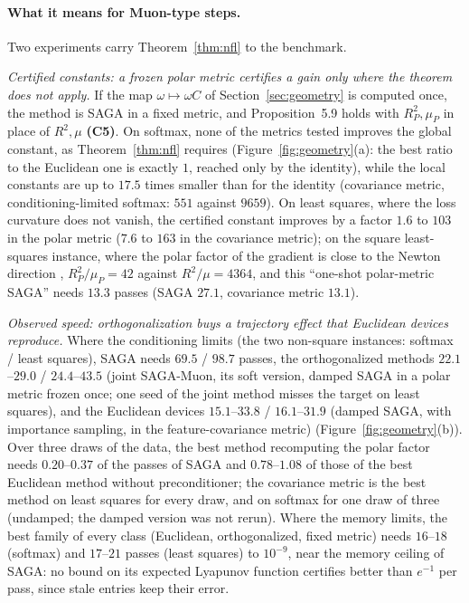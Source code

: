 \documentclass[10pt]{article}
\theoremstyle{remark}
\newcommand{\finding}[1]{\textbf{(#1)}}
\begin{document}
\paragraph{What it means for Muon-type steps.} Two experiments carry Theorem~\ref{thm:nfl} to the benchmark.

\begin{description}[leftmargin=2.3em,labelwidth=2.0em,labelsep=0.3em,itemsep=1pt,topsep=3pt,parsep=0pt,font=\normalfont\bfseries]
\item[(M4)] \emph{Certified constants: a frozen polar metric certifies a gain only where the theorem does not apply.} If
the map $\omega\mapsto\omega C$ of Section~\ref{sec:geometry} is computed once, the method is SAGA in a fixed metric,
and Proposition~5.9 holds with $R_P^2,\mu_P$ in place of $R^2,\mu$ \finding{C5}. On softmax, none of the metrics tested improves the
global constant, as Theorem~\ref{thm:nfl} requires (Figure~\ref{fig:geometry}(a): the best ratio to the Euclidean one is
exactly $1$, reached only by the identity), while the local constants are up to $17.5$ times smaller than for the
identity (covariance metric, conditioning-limited softmax: $551$ against $9659$). On least squares, where the
loss curvature does not vanish, the certified constant improves by a factor $1.6$ to $103$ in the polar metric ($7.6$ to $163$ in the covariance metric); on the square least-squares
instance, where the polar factor of the gradient is close to the Newton direction \cite{shulgin2026quadratic},
$R_P^2/\mu_P=42$ against $R^2/\mu=4364$, and this ``one-shot polar-metric SAGA'' needs $13.3$ passes (SAGA $27.1$,
covariance metric $13.1$).
\item[(M3)] \emph{Observed speed: orthogonalization buys a trajectory effect that Euclidean devices reproduce.} Where
the conditioning limits (the two non-square instances: softmax / least squares), SAGA needs $69.5$ / $98.7$ passes, the
orthogonalized methods $22.1$--$29.0$ / $24.4$--$43.5$ (joint SAGA-Muon, its soft version, damped SAGA in a polar
metric frozen once; one seed of the joint method misses the target on least squares), and the Euclidean devices $15.1$--$33.8$ / $16.1$--$31.9$ (damped SAGA, with importance sampling,
in the feature-covariance metric) (Figure~\ref{fig:geometry}(b)). Over three draws of the data, the best method recomputing the polar factor
needs $0.20$--$0.37$ of the passes of SAGA and $0.78$--$1.08$ of those of the best Euclidean method without
preconditioner; the covariance metric is the best method on least squares for every draw, and on softmax for one draw
of three (undamped; the damped version was not rerun). Where the memory limits, the best family of every class
(Euclidean, orthogonalized, fixed metric) needs $16$--$18$ (softmax) and $17$--$21$ passes (least squares) to
$10^{-9}$, near the memory ceiling of SAGA: no bound on its expected Lyapunov function certifies better than $e^{-1}$
per pass, since stale entries keep their error.
\end{description}
\end{document}
